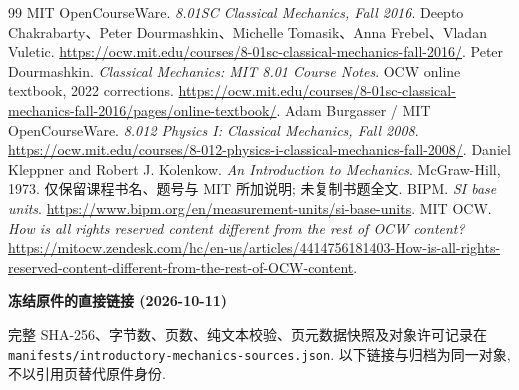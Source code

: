\begin{thebibliography}{99}
 MIT OpenCourseWare. \emph{8.01SC Classical Mechanics, Fall 2016}. Deepto Chakrabarty、Peter Dourmashkin、Michelle Tomasik、Anna Frebel、Vladan Vuletic. \url{https://ocw.mit.edu/courses/8-01sc-classical-mechanics-fall-2016/}.
 Peter Dourmashkin. \emph{Classical Mechanics: MIT 8.01 Course Notes}. OCW online textbook, 2022 corrections. \url{https://ocw.mit.edu/courses/8-01sc-classical-mechanics-fall-2016/pages/online-textbook/}.
 Adam Burgasser / MIT OpenCourseWare. \emph{8.012 Physics I: Classical Mechanics, Fall 2008}. \url{https://ocw.mit.edu/courses/8-012-physics-i-classical-mechanics-fall-2008/}.
 Daniel Kleppner and Robert J. Kolenkow. \emph{An Introduction to Mechanics}. McGraw-Hill, 1973. 仅保留课程书名、题号与 MIT 所加说明; 未复制书题全文.
 BIPM. \emph{SI base units}. \url{https://www.bipm.org/en/measurement-units/si-base-units}.
 MIT OCW. \emph{How is all rights reserved content different from the rest of OCW content?} \url{https://mitocw.zendesk.com/hc/en-us/articles/4414756181403-How-is-all-rights-reserved-content-different-from-the-rest-of-OCW-content}.
\end{thebibliography}
\par\addvspace{10pt}\noindent\textbf{冻结原件的直接链接 (2026-10-11)}
\par 完整 SHA-256、字节数、页数、纯文本校验、页元数据快照及对象许可记录在 \nolinkurl{manifests/introductory-mechanics-sources.json}. 以下链接与归档为同一对象, 不以引用页替代原件身份.
